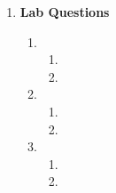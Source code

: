 \documentclass[11pt]{article}
\newcommand{\Newpage}{\end{preview}\begin{preview}}
\begin{document}
\begin{preview}
\begin{enumerate}
\begin{enumerate}
\begin{align*}
                                                               & =                                           0\textbf{i} +  \frac{\pi}{2}\textbf{j} +  0\textbf{k}                                    \\\\
                    \int_C \nabla_{\phi} \cdot \; d \textbf{r} & =\phi(0,\pi/2,0) - \phi(\pi,\pi/2,0)                                                                                                 \\
                    &= cos(0{\times}sin((\pi/2)e^{0}))  - cos(\pi{\times}sin((\pi/2)e^{0})) \\
                    &= 1 - -1 = 2
                  \end{align*}
            \item
          \end{enumerate}
    \item \textbf{Lab Questions}
          \begin{enumerate}
            \item
                  \begin{enumerate}
                    \item
                    \item
                  \end{enumerate}
            \item
                  \begin{enumerate}
                    \item
                    \item
                  \end{enumerate}
            \item
                  \begin{enumerate}
                    \item
                    \item
                  \end{enumerate}
          \end{enumerate}
  \end{enumerate}

  \Newpage


\end{preview}
\end{document}
